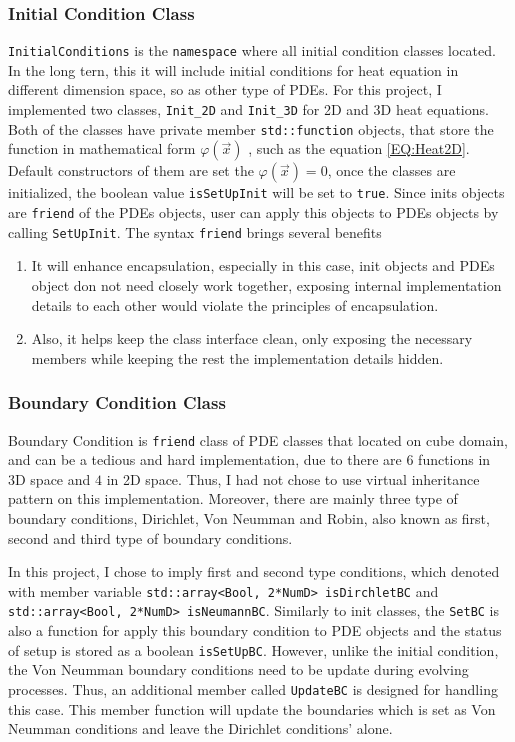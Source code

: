 \subsubsection{Initial Condition Class}
\texttt{InitialConditions} is the \texttt{namespace} where all initial condition classes located.
In the long tern, this it will include initial conditions for heat equation in different dimension space, so as other type of PDEs.
For this project, I implemented two classes, \texttt{Init\_2D} and \texttt{Init\_3D} for 2D and 3D heat equations.
Both of the classes have private member \texttt{std::function} objects, 
that store the function in mathematical form $\varphi(\vec{x})$ , such as the equation \ref{EQ:Heat2D}.
Default constructors of them are set the $\varphi(\vec{x}) = 0$, once the classes are initialized, the 
boolean value \texttt{isSetUpInit} will be set to \texttt{true}.
Since inits objects are \texttt{friend} of the PDEs objects, user can apply this objects to PDEs objects by calling \texttt{SetUpInit}.
The syntax \texttt{friend} brings several benefits
\begin{enumerate}
  \item It will enhance encapsulation, especially in this case, init objects and PDEs object don not need closely work together,
  exposing internal implementation details to each other would violate the principles of encapsulation. 
  \item Also, it helps keep the class interface clean, only
  exposing the necessary members while keeping the rest the implementation details hidden.
\end{enumerate}


\subsubsection{Boundary Condition Class}
Boundary Condition is \texttt{friend} class of PDE classes that located on cube domain, and can be a tedious and hard implementation, 
due to there are $6$ functions in 3D space and $4$ in 2D space.
Thus, I had not chose to use virtual inheritance pattern on this implementation.
Moreover, there are mainly three type of boundary conditions, Dirichlet, Von Neumman and Robin, also known as first, second and third type 
of boundary conditions.

In this project, I chose to imply first and second type conditions, which denoted with 
member variable \texttt{std::array<Bool, 2*NumD> isDirchletBC} and \texttt{std::array<Bool, 2*NumD> isNeumannBC}.
Similarly to init classes, the \texttt{SetBC} is also a function for apply this boundary condition to PDE objects and the status of setup 
is stored as a boolean \texttt{isSetUpBC}.
However, unlike the initial condition, the Von Neumman boundary conditions need to be update during evolving processes.
Thus, an additional member called \texttt{UpdateBC} is designed for handling this case.
This member function will update the boundaries which is set as Von Neumman conditions and leave the Dirichlet conditions' alone.

